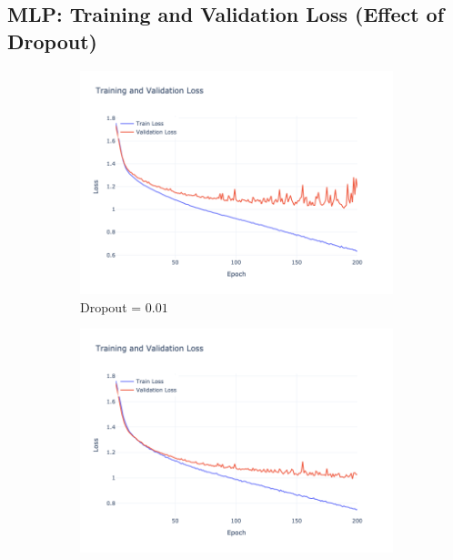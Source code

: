 \subsection{MLP: Training and Validation Loss (Effect of Dropout)}
\begin{figure}[htbp!]
    \centering
    \begin{subfigure}{0.32\textwidth}
        \centering
        \includegraphics[width=\textwidth]{images/mlp-training-validation-loss-batch-64-lr-0.002-epochs-200-hidden-200-dropout-0.01-l2-0.0-layers-2-act-relu-opt-sgd-mom-0.0.png}
        \caption{Dropout = $0.01$}
    \end{subfigure}
    \begin{subfigure}{0.32\textwidth}
        \centering
        \includegraphics[width=\textwidth]{images/mlp-training-validation-loss-batch-64-lr-0.002-epochs-200-hidden-200-dropout-0.25-l2-0.0-layers-2-act-relu-opt-sgd-mom-0.0.png}

\end{subfigure}
\end{figure}
